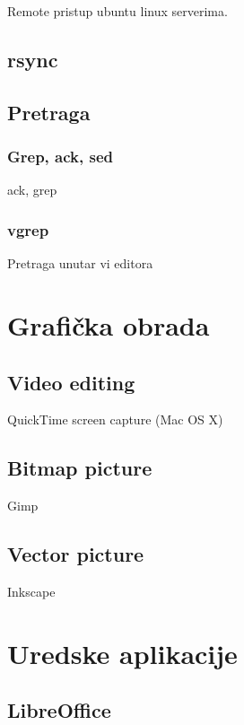 \documentclass[times, utf8, seminar]{fit}
\begin{document}
Remote pristup ubuntu linux serverima.

\section{rsync}

\section{Pretraga}

\subsection{Grep, ack, sed}

ack, grep

\subsection{vgrep}

Pretraga unutar vi editora

\chapter{Grafička obrada}

\section{Video editing}

QuickTime screen capture (Mac OS X)

\section{Bitmap picture}

Gimp

\section{Vector picture}

Inkscape

\chapter{Uredske aplikacije}

\section{LibreOffice}
\end{document}
